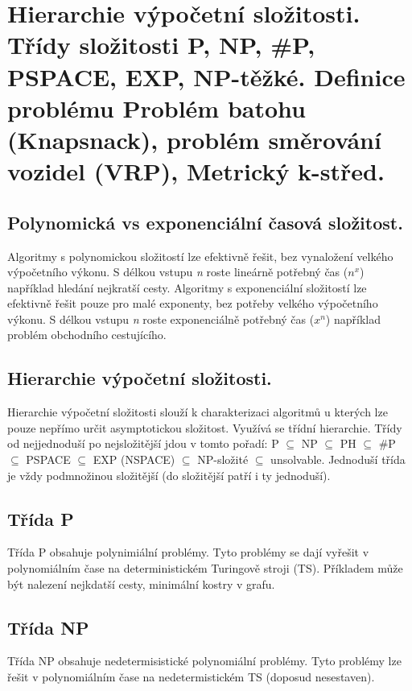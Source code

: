 \section{Hierarchie výpočetní složitosti. Třídy složitosti P, NP, \#P, PSPACE, EXP, NP-těžké. Definice problému Problém batohu (Knapsnack), problém směrování vozidel (VRP), Metrický k-střed.}

\subsection{Polynomická vs exponenciální časová složitost.}

Algoritmy s polynomickou složitostí lze efektivně řešit, bez vynaložení velkého výpočetního výkonu. 
S délkou vstupu \textit{n} roste lineárně potřebný čas ($n^x$) například hledání nejkratší cesty. 
Algoritmy s exponenciální složitostí lze efektivně řešit pouze pro malé exponenty, bez potřeby velkého výpočetního výkonu. 
S délkou vstupu \textit{n} roste exponenciálně potřebný čas ($x^n$) například problém obchodního cestujícího.

\subsection{Hierarchie výpočetní složitosti.}

Hierarchie výpočetní složitosti slouží k charakterizaci algoritmů u kterých lze pouze nepřímo určit asymptotickou složitost. 
Využívá se třídní hierarchie. 
Třídy od nejjednoduší po nejsložitější jdou v tomto pořadí: P $\subseteq$ NP $\subseteq$ PH $\subseteq$ \#P $\subseteq$ PSPACE $\subseteq$ EXP (NSPACE) $\subseteq$ NP-složité $\subseteq$ unsolvable. 
Jednoduší třída je vždy podmnožinou složitější (do složitější patří i ty jednoduší).

\subsection{Třída P}

Třída P obsahuje polynimiální problémy. 
Tyto problémy se dají vyřešit v polynomiálním čase na deterministickém Turingově stroji (TS). 
Příkladem může být nalezení nejkdatší cesty, minimální kostry v grafu.

\subsection{Třída NP}

Třída NP obsahuje nedetermisistické polynomiální problémy. 
Tyto problémy lze řešit v polynomiálním čase na nedetermistickém TS (doposud nesestaven).

